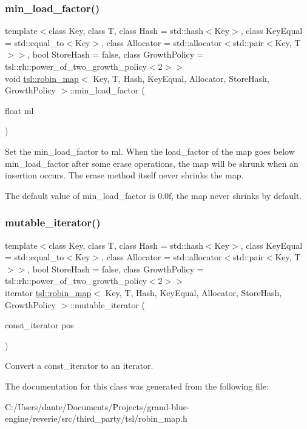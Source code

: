 \subsubsection{\texorpdfstring{min\_load\_factor()}{min\_load\_factor()}}
{\footnotesize\ttfamily template$<$class Key, class T, class Hash = std\+::hash$<$\+Key$>$, class Key\+Equal = std\+::equal\+\_\+to$<$\+Key$>$, class Allocator = std\+::allocator$<$std\+::pair$<$\+Key, T$>$$>$, bool Store\+Hash = false, class Growth\+Policy = tsl\+::rh\+::power\+\_\+of\+\_\+two\+\_\+growth\+\_\+policy$<$2$>$$>$ \\
void \mbox{\hyperlink{classtsl_1_1robin__map}{tsl\+::robin\+\_\+map}}$<$ Key, T, Hash, Key\+Equal, Allocator, Store\+Hash, Growth\+Policy $>$\+::min\+\_\+load\+\_\+factor (\begin{DoxyParamCaption}\item[{float}]{ml }\end{DoxyParamCaption})\hspace{0.3cm}{\ttfamily [inline]}}

Set the {\ttfamily min\+\_\+load\+\_\+factor} to {\ttfamily ml}. When the {\ttfamily load\+\_\+factor} of the map goes below {\ttfamily min\+\_\+load\+\_\+factor} after some erase operations, the map will be shrunk when an insertion occurs. The erase method itself never shrinks the map.

The default value of {\ttfamily min\+\_\+load\+\_\+factor} is 0.\+0f, the map never shrinks by default. \mbox{\label{classtsl_1_1robin__map_a4250011f568c4ebedee82aa93f94657f}} 
\subsubsection{\texorpdfstring{mutable\_iterator()}{mutable\_iterator()}}
{\footnotesize\ttfamily template$<$class Key, class T, class Hash = std\+::hash$<$\+Key$>$, class Key\+Equal = std\+::equal\+\_\+to$<$\+Key$>$, class Allocator = std\+::allocator$<$std\+::pair$<$\+Key, T$>$$>$, bool Store\+Hash = false, class Growth\+Policy = tsl\+::rh\+::power\+\_\+of\+\_\+two\+\_\+growth\+\_\+policy$<$2$>$$>$ \\
iterator \mbox{\hyperlink{classtsl_1_1robin__map}{tsl\+::robin\+\_\+map}}$<$ Key, T, Hash, Key\+Equal, Allocator, Store\+Hash, Growth\+Policy $>$\+::mutable\+\_\+iterator (\begin{DoxyParamCaption}\item[{const\+\_\+iterator}]{pos }\end{DoxyParamCaption})\hspace{0.3cm}{\ttfamily [inline]}}

Convert a const\+\_\+iterator to an iterator. 

The documentation for this class was generated from the following file\+:\begin{DoxyCompactItemize}
\item 
C\+:/\+Users/dante/\+Documents/\+Projects/grand-\/blue-\/engine/reverie/src/third\+\_\+party/tsl/robin\+\_\+map.\+h\end{DoxyCompactItemize}
